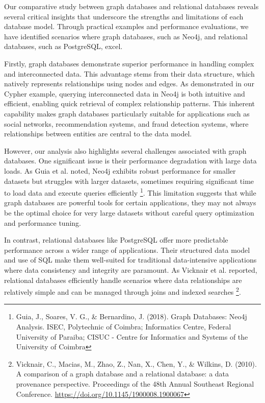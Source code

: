 Our comparative study between graph databases and relational databases reveals several critical insights that underscore the strengths and limitations of each database model. Through practical examples and performance evaluations, we have identified scenarios where graph databases, such as Neo4j, and relational databases, such as PostgreSQL, excel.

Firstly, graph databases demonstrate superior performance in handling complex and interconnected data. This advantage stems from their data structure, which natively represents relationships using nodes and edges. As demonstrated in our Cypher example, querying interconnected data in Neo4j is both intuitive and efficient, enabling quick retrieval of complex relationship patterns. This inherent capability makes graph databases particularly suitable for applications such as social networks, recommendation systems, and fraud detection systems, where relationships between entities are central to the data model.

However, our analysis also highlights several challenges associated with graph databases. One significant issue is their performance degradation with large data loads. As Guia et al. noted, Neo4j exhibits robust performance for smaller datasets but struggles with larger datasets, sometimes requiring significant time to load data and execute queries efficiently \footnote{Guia, J., Soares, V. G., \& Bernardino, J. (2018). Graph Databases: Neo4j Analysis. ISEC, Polytechnic of Coimbra; Informatics Centre, Federal University of Paraiba; CISUC - Centre for Informatics and Systems of the University of Coimbra}. This limitation suggests that while graph databases are powerful tools for certain applications, they may not always be the optimal choice for very large datasets without careful query optimization and performance tuning.

In contrast, relational databases like PostgreSQL offer more predictable performance across a wider range of applications. Their structured data model and use of SQL make them well-suited for traditional data-intensive applications where data consistency and integrity are paramount. As Vicknair et al. reported, relational databases efficiently handle scenarios where data relationships are relatively simple and can be managed through joins and indexed searches \footnote{Vicknair, C., Macias, M., Zhao, Z., Nan, X., Chen, Y., \& Wilkins, D. (2010). A comparison of a graph database and a relational database: a data provenance perspective. Proceedings of the 48th Annual Southeast Regional Conference. \url{https://doi.org/10.1145/1900008.1900067}}.


